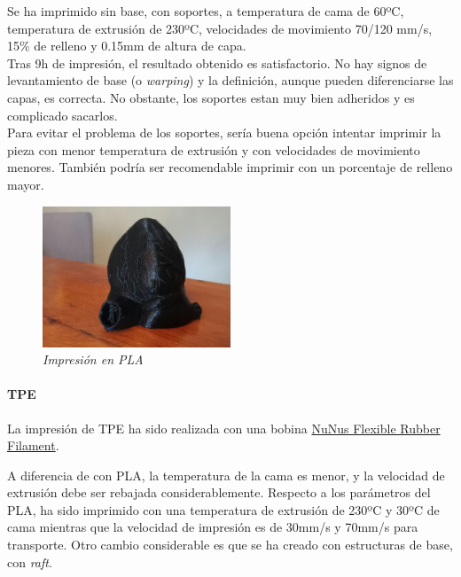 \documentclass[a4paper,12pt]{article}
\begin{document}
Se ha imprimido sin base, con soportes, a temperatura de cama de 60ºC, temperatura de extrusión de 230ºC, velocidades de movimiento 70/120 mm/s, 15\% de relleno y 0.15mm de altura de capa.\\

Tras 9h de impresión, el resultado obtenido es satisfactorio. No hay signos de levantamiento de base (o \emph{warping}) y la definición, aunque pueden diferenciarse las capas, es correcta. No obstante, los soportes estan muy bien adheridos y es complicado sacarlos.\\

Para evitar el problema de los soportes, sería buena opción intentar imprimir la pieza con menor temperatura de extrusión y con velocidades de movimiento menores. También podría ser recomendable imprimir con un porcentaje de relleno mayor.

	\begin{figure}[!ht]
	\begin{center}
	  \includegraphics[width=0.5\textwidth]{Figuras/heart3.jpg}
	  \caption{\emph{Impresi\'{o}n en PLA}}
	\end{center}
	\label{heartPLA}
	\end{figure}


\paragraph{TPE}
La impresión de TPE ha sido realizada con una bobina \href{http://www.nunus-filamente.com/filamente/product/nunus-flexible-rubber-filament-175mm-1kg-rot/}{NuNus Flexible Rubber Filament}.

A diferencia de con PLA, la temperatura de la cama es menor, y la velocidad de extrusión debe ser rebajada considerablemente. Respecto a los parámetros del PLA, ha sido imprimido con una temperatura de extrusión de 230ºC y 30ºC de cama mientras que la velocidad de impresión es de 30mm/s y 70mm/s para transporte. Otro cambio considerable es que se ha creado con estructuras de base, con \emph{raft}.\\
\end{document}
